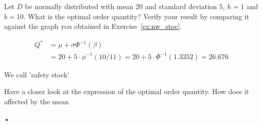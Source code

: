 \begin{question}
Let $D$ be normally distributed with mean 20 and standard deviation 5, $h=1$ and $b=10$. What is the optimal order quantity? Verify your result by comparing it against the graph you obtained in Exercise~\ref{ex:nw_stoc}. 
\end{question}

\begin{solution}
\begin{align*}
Q^* 
& = \mu + \sigma \Phi^{-1}(\beta) \\
& = 20 + 5\cdot \phi^{-1}(10/11) = 20 + 5\cdot \Phi^{-1}(1.3352) = 26.676
\end{align*}
\end{solution}

\begin{question}
We call 'safety stock' 

Have a closer look at the expression of the optimal order quantity. How does it affected by the mean
\end{question}

\begin{solution}
•
\end{solution}

